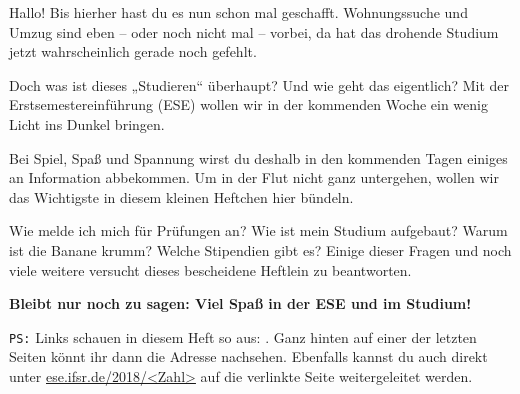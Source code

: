 

Hallo! Bis hierher hast du es nun schon mal geschafft. Wohnungssuche und Umzug sind eben -- oder noch nicht mal -- vorbei, da hat das drohende Studium jetzt wahrscheinlich gerade noch gefehlt.

Doch was ist dieses „Studieren“ überhaupt? Und wie geht das eigentlich? Mit der Erstsemestereinführung (ESE) wollen wir in der kommenden Woche ein wenig Licht ins Dunkel bringen. 



Bei Spiel, Spaß und Spannung wirst du deshalb in den kommenden Tagen einiges an Information abbekommen. Um in der Flut nicht ganz untergehen, wollen wir das Wichtigste in diesem kleinen Heftchen hier bündeln.

Wie melde ich mich für Prüfungen an?  Wie ist mein Studium aufgebaut? Warum ist die Banane krumm? Welche Stipendien gibt es?
Einige dieser Fragen und noch viele weitere versucht dieses bescheidene Heftlein zu beantworten. %

\textbf{Bleibt nur noch zu sagen: Viel Spaß in der ESE und im Studium!}

\bigskip
{\small \texttt{PS:} Links schauen in diesem Heft so aus: . Ganz hinten auf einer der letzten Seiten könnt ihr dann die Adresse nachsehen. Ebenfalls kannst du auch direkt unter \url{ese.ifsr.de/2018/<Zahl>} auf die verlinkte Seite weitergeleitet werden.}